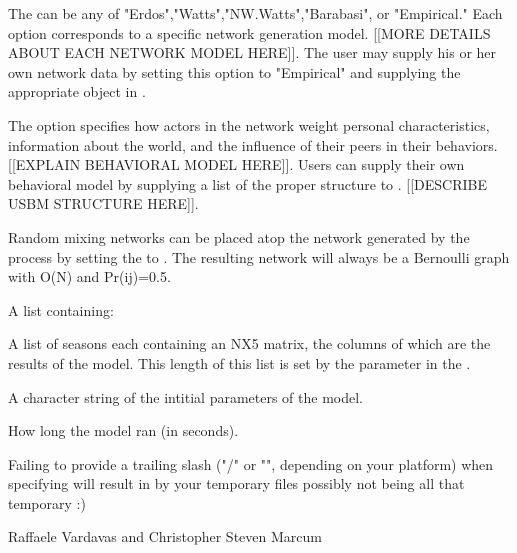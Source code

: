 \documentclass[letterpaper]{book}
\begin{document}
%
\begin{Details}\relax
The  can be any of "Erdos","Watts","NW.Watts","Barabasi", or "Empirical." Each option corresponds to a specific network generation model. 
[[MORE DETAILS ABOUT EACH NETWORK MODEL HERE]]. The user may supply his or her own network data by setting this option to "Empirical" and supplying the appropriate
 object in .

The  option specifies how actors in the network weight personal characteristics, information about the world, and the influence of their peers in their behaviors. [[EXPLAIN BEHAVIORAL MODEL HERE]].
Users can supply their own behavioral model by supplying a list of the proper structure to . [[DESCRIBE USBM STRUCTURE HERE]].

Random mixing networks can be placed atop the network generated by the process by setting the  to . The resulting network will always be a Bernoulli graph with O(N) and Pr(ij)=0.5. 
\end{Details}
%
\begin{Value}
A list containing:
\begin{ldescription}
\item[\code{Results}] A list of seasons each containing an NX5 matrix, the columns of which are the results of the model. 
This length of this list is set by the  parameter in the .
\item[\code{Params}] A character string of the intitial parameters of the model.
\item[\code{Runtime}] How long the model ran (in seconds).
\end{ldescription}
\end{Value}
%
\begin{Note}\relax
Failing to provide a trailing slash ("/" or "\bsl{}", depending on your platform) when specifying  will result in by your temporary files possibly not being all that temporary :) 
\end{Note}
%
\begin{Author}\relax
Raffaele Vardavas and Christopher Steven Marcum
\end{Author}
\printindex{}
\end{document}

